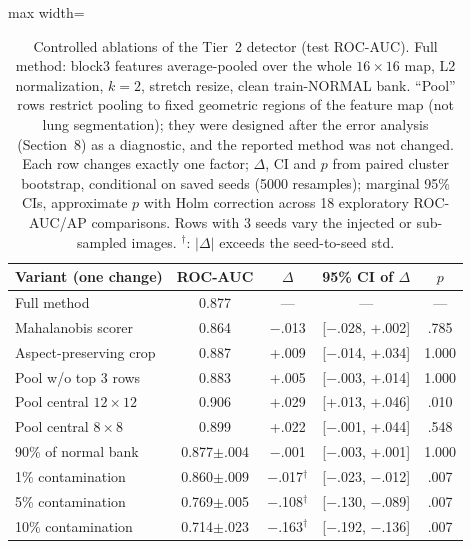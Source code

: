 \begin{table}[t]
\centering
\footnotesize
\setlength{\tabcolsep}{3.5pt}
\begin{adjustbox}{max width=\columnwidth}
\begin{tabular}{lcccc}
\toprule
Variant (one change) & ROC-AUC & $\Delta$ & 95\% CI of $\Delta$ & $p$ \\
\midrule
Full method & 0.877 & --- & --- & --- \\
\midrule
Mahalanobis scorer & 0.864 & $-$.013 & {\scriptsize[$-$.028, +.002]} & .785 \\
Aspect-preserving crop & 0.887 & +.009 & {\scriptsize[$-$.014, +.034]} & 1.000 \\
Pool w/o top 3 rows & 0.883 & +.005 & {\scriptsize[$-$.003, +.014]} & 1.000 \\
Pool central $12{\times}12$ & 0.906 & +.029 & {\scriptsize[+.013, +.046]} & .010 \\
Pool central $8{\times}8$ & 0.899 & +.022 & {\scriptsize[$-$.001, +.044]} & .548 \\
90\% of normal bank & 0.877{\scriptsize$\pm$.004} & $-$.001 & {\scriptsize[$-$.003, +.001]} & 1.000 \\
1\% contamination & 0.860{\scriptsize$\pm$.009} & $-$.017$^\dagger$ & {\scriptsize[$-$.023, $-$.012]} & .007 \\
5\% contamination & 0.769{\scriptsize$\pm$.005} & $-$.108$^\dagger$ & {\scriptsize[$-$.130, $-$.089]} & .007 \\
10\% contamination & 0.714{\scriptsize$\pm$.023} & $-$.163$^\dagger$ & {\scriptsize[$-$.192, $-$.136]} & .007 \\
\bottomrule
\end{tabular}
\end{adjustbox}
\caption{Controlled ablations of the Tier~2 detector (test ROC-AUC). Full method: block3 features average-pooled over the whole $16{\times}16$ map, L2 normalization, $k{=}2$, stretch resize, clean train-NORMAL bank. ``Pool'' rows restrict pooling to fixed geometric regions of the feature map (not lung segmentation); they were designed after the error analysis (Section~8) as a diagnostic, and the reported method was not changed. Each row changes exactly one factor; $\Delta$, CI and $p$ from paired cluster bootstrap, conditional on saved seeds (5000 resamples); marginal 95\% CIs, approximate $p$ with Holm correction across 18 exploratory ROC-AUC/AP comparisons. Rows with 3 seeds vary the injected or sub-sampled images. $^\dagger$: $|\Delta|$ exceeds the seed-to-seed std.}
\label{tab:ablation}
\end{table}
